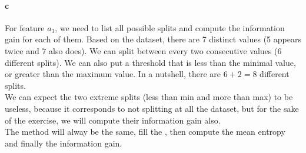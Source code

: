 \documentclass[a4paper, 10pt]{article}
\begin{document}
\paragraph{c}
For feature $a_3$, we need to list all possible splits and compute the information gain for each of them.
Based on the dataset, there are 7 distinct values (5 appears twice and 7 also does). We can split between every
two consecutive values (6 different splits). We can also put a threshold that is less than the minimal value, or greater than 
the maximum value. In a nutshell, there are $6+2=8$ different splits.
\\
We can expect the two extreme splits (less than min and more than max) to be useless, because it corresponds to not 
splitting at all the dataset, but for the sake of the exercise, we will compute their information gain also.
\\
The method will alway be the same, fill the , then compute the mean entropy and finally the information gain.
\end{document}
